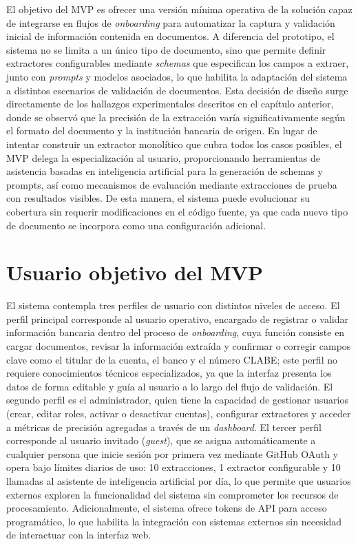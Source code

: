 El objetivo del MVP es ofrecer una versión mínima operativa de la solución capaz de integrarse en flujos de \textit{onboarding} para automatizar la captura y validación inicial de información contenida en documentos. A diferencia del prototipo, el sistema no se limita a un único tipo de documento, sino que permite definir extractores configurables mediante \textit{schemas} que especifican los campos a extraer, junto con \textit{prompts} y modelos asociados, lo que habilita la adaptación del sistema a distintos escenarios de validación de documentos. Esta decisión de diseño surge directamente de los hallazgos experimentales descritos en el capítulo anterior, donde se observó que la precisión de la extracción varía significativamente según el formato del documento y la institución bancaria de origen. En lugar de intentar construir un extractor monolítico que cubra todos los casos posibles, el MVP delega la especialización al usuario, proporcionando herramientas de asistencia basadas en inteligencia artificial para la generación de schemas y prompts, así como mecanismos de evaluación mediante extracciones de prueba con resultados visibles. De esta manera, el sistema puede evolucionar su cobertura sin requerir modificaciones en el código fuente, ya que cada nuevo tipo de documento se incorpora como una configuración adicional.



\section{Usuario objetivo del MVP}

El sistema contempla tres perfiles de usuario con distintos niveles de acceso. El perfil principal corresponde al usuario operativo, encargado de registrar o validar información bancaria dentro del proceso de \textit{onboarding}, cuya función consiste en cargar documentos, revisar la información extraída y confirmar o corregir campos clave como el titular de la cuenta, el banco y el número CLABE; este perfil no requiere conocimientos técnicos especializados, ya que la interfaz presenta los datos de forma editable y guía al usuario a lo largo del flujo de validación. El segundo perfil es el administrador, quien tiene la capacidad de gestionar usuarios (crear, editar roles, activar o desactivar cuentas), configurar extractores y acceder a métricas de precisión agregadas a través de un \textit{dashboard}. El tercer perfil corresponde al usuario invitado (\textit{guest}), que se asigna automáticamente a cualquier persona que inicie sesión por primera vez mediante GitHub OAuth y opera bajo límites diarios de uso: 10 extracciones, 1 extractor configurable y 10 llamadas al asistente de inteligencia artificial por día, lo que permite que usuarios externos exploren la funcionalidad del sistema sin comprometer los recursos de procesamiento. Adicionalmente, el sistema ofrece tokens de API para acceso programático, lo que habilita la integración con sistemas externos sin necesidad de interactuar con la interfaz web.



